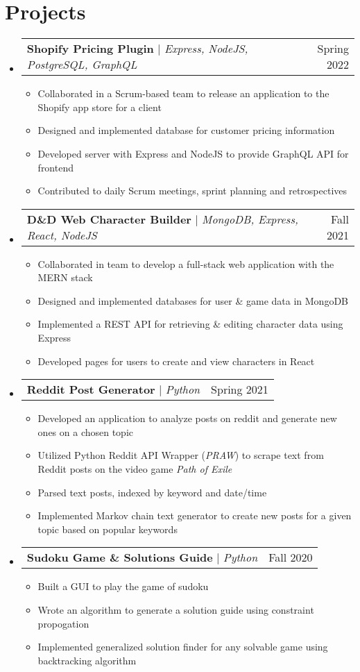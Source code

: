\documentclass[letterpaper,11pt]{article}
\makeatletter
\newcommand{\resumeItem}[1]{
  \item\small{
    {#1 \vspace{-2pt}}
  }
}
\newcommand{\resumeProjectHeading}[2]{
    \item
    \begin{tabular*}{0.97\textwidth}{l@{\extracolsep{\fill}}r}
      \small#1 & #2 \\
    \end{tabular*}\vspace{-7pt}
}
\newcommand{\resumeSubHeadingListStart}{\begin{itemize}[leftmargin=0.15in, label={}]}
\newcommand{\resumeSubHeadingListEnd}{\end{itemize}}
\newcommand{\resumeItemListStart}{\begin{itemize}}
\newcommand{\resumeItemListEnd}{\end{itemize}\vspace{-5pt}}
\makeatother
\begin{document}
\section{Projects}
    \resumeSubHeadingListStart
      \resumeProjectHeading
          {\textbf{Shopify Pricing Plugin} $|$ \emph{Express, NodeJS, PostgreSQL, GraphQL}}{Spring 2022}
          \resumeItemListStart
            \resumeItem{Collaborated in a Scrum-based team to release an application to the Shopify app store for a client}
            \resumeItem{Designed and implemented database for customer pricing information}
            \resumeItem{Developed server with Express and NodeJS to provide GraphQL API for frontend}
            \resumeItem{Contributed to daily Scrum meetings, sprint planning and retrospectives}
          \resumeItemListEnd
      \resumeProjectHeading
          {\textbf{D\&D Web Character Builder} $|$ \emph{MongoDB, Express, React, NodeJS}}{Fall 2021}
          \resumeItemListStart
            \resumeItem{Collaborated in team to develop a full-stack web application with the MERN stack}
            \resumeItem{Designed and implemented databases for user \& game data in MongoDB}
            \resumeItem{Implemented a REST API for retrieving \& editing character data using Express}
            \resumeItem{Developed pages for users to create and view characters in React}
          \resumeItemListEnd
      \resumeProjectHeading
          {\textbf{Reddit Post Generator} $|$ \emph{Python}}{Spring 2021}
          \resumeItemListStart
            \resumeItem{Developed an application to analyze posts on reddit and generate new ones on a chosen topic}
            \resumeItem{Utilized Python Reddit API Wrapper (\emph{PRAW}) to scrape text from Reddit posts on the video game \emph{Path of Exile}}
            \resumeItem{Parsed text posts, indexed by keyword and date/time}
            \resumeItem{Implemented Markov chain text generator to create new posts for a given topic based on popular keywords}
          \resumeItemListEnd
      \resumeProjectHeading
          {\textbf{Sudoku Game \& Solutions Guide} $|$ \emph{Python}}{Fall 2020}
          \resumeItemListStart
            \resumeItem{Built a GUI to play the game of sudoku}
            \resumeItem{Wrote an algorithm to generate a solution guide using constraint propogation}
            \resumeItem{Implemented generalized solution finder for any solvable game using backtracking algorithm}
          \resumeItemListEnd
    \resumeSubHeadingListEnd
\end{document}
